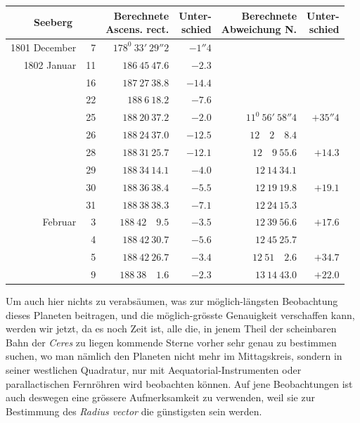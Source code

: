 \begin{center}
{\small\setlength{\tabcolsep}{4pt}
\begin{tabular}{r r|r|r|r|r}
\multicolumn{2}{c|}{Seeberg}&\shortstack{Berechnete\\Ascens. rect.}&\shortstack{Unter-\\schied}&\shortstack{Berechnete\\Abweichung N.}&\shortstack{Unter-\\schied}\\\hline
1801 December&7&$178^0\ 33'\ 29''2$&$-1''4$&&\\
1802 Januar&11&$186\ 45\ 47.6$&$-2.3$&&\\
&16&$187\ 27\ 38.8$&$-14.4$&&\\
&22&$188\ 6\ 18.2$&$-7.6$&&\\
&25&$188\ 20\ 37.2$&$-2.0$&$11^0\ 56'\ 58''4$&$+35''4$\\
&26&$188\ 24\ 37.0$&$-12.5$&$12\quad2\quad8.4$&\\
&28&$188\ 31\ 25.7$&$-12.1$&$12\quad9\ 55.6$&$+14.3$\\
&29&$188\ 34\ 14.1$&$-4.0$&$12\ 14\ 34.1$&\\
&30&$188\ 36\ 38.4$&$-5.5$&$12\ 19\ 19.8$&$+19.1$\\
&31&$188\ 38\ 38.3$&$-7.1$&$12\ 24\ 15.3$&\\
Februar&3&$188\ 42\quad9.5$&$-3.5$&$12\ 39\ 56.6$&$+17.6$\\
&4&$188\ 42\ 30.7$&$-5.6$&$12\ 45\ 25.7$&\\
&5&$188\ 42\ 26.7$&$-3.4$&$12\ 51\quad2.6$&$+34.7$\\
&9&$188\ 38\quad1.6$&$-2.3$&$13\ 14\ 43.0$&$+22.0$
\end{tabular}}
\end{center}
\expandafter\def\csname HistoricalNoteText18\endcsname{Um auch hier nichts zu verabsäumen, was zur möglich-längsten Beobachtung dieses Planeten beitragen, und die möglich-grösste Genauigkeit verschaffen kann, werden wir jetzt, da es noch Zeit ist, alle die, in jenem Theil der scheinbaren Bahn der \textit{Ceres} zu liegen kommende Sterne vorher sehr genau zu bestimmen suchen, wo man nämlich den Planeten nicht mehr im Mittagskreis, sondern in seiner westlichen Quadratur, nur mit Aequatorial-Instrumenten oder parallactischen Fernröhren wird beobachten können. Auf jene Beobachtungen ist auch deswegen eine grössere Aufmerksamkeit zu verwenden, weil sie zur Bestimmung des \textit{Radius vector} die günstigsten sein werden.}
%
